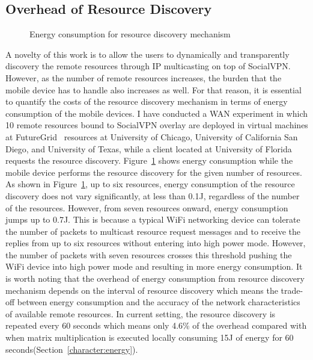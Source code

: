 \subsection{Overhead of Resource Discovery}
\label{offloading:overhead_discovery}
%
\begin{figure}
\centering
{}
\caption{Energy consumption for resource discovery mechanism}
\label{fig:energy_discovery}
\end{figure}
%
A novelty of this work is to allow the users to dynamically and
transparently discovery the remote resources through IP multicasting on
top of SocialVPN.
%
However, as the number of remote resources increases, the burden that
the mobile device has to handle also increases as well.
%
For that reason, it is essential to quantify the costs of the resource
discovery mechanism in terms of energy consumption of the mobile
devices.
%
I have conducted a WAN experiment in which 10 remote resources bound to
SocialVPN overlay are deployed in virtual machines at
FutureGrid~\cite{futuregrid} resources at University of Chicago,
University of California San Diego, and University of Texas, while a
client located at University of Florida requests the resource discovery.
%
Figure~\ref{fig:energy_discovery} shows energy consumption while the mobile
device performs the resource discovery for the given number of
resources.
%
As shown in Figure~\ref{fig:energy_discovery}, up to six resources,
energy consumption of the resource discovery does not vary
significantly, at less than 0.1J, regardless of the number of the
resources.
%
However, from seven resources onward, energy consumption jumps up to
0.7J.
%
This is because a typical WiFi networking device can tolerate the
number of packets to multicast resource request messages and to receive
the replies from up to six resources without entering into high power
mode.
%
However, the number of packets with seven resources crosses this
threshold pushing the WiFi device into high power mode and resulting in
more energy consumption.
%
It is worth noting that the overhead of energy consumption from resource
discovery mechanism depends on the interval of resource discovery which
means the trade-off between energy consumption and the accuracy of the
network characteristics of available remote resources.
%
In current setting, the resource discovery is repeated every 60 seconds
which means only 4.6\% of the overhead compared with when matrix
multiplication is executed locally consuming 15J of energy for 60
seconds(Section~\ref{character:energy}).
%
